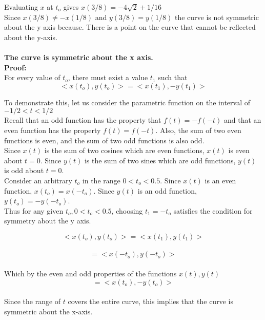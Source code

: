 \documentclass[a4paper,10pt]{scrartcl}
\begin{document}
Evaluating $x$ at $t_o$ gives $x(3/8) = -4\sqrt{2} + 1/16$ \\

Since $x(3/8) \neq -x(1/8)$ and $y(3/8) = y(1/8)$ the curve is not symmetric about the y axis because. There is a point on the curve that
cannot be reflected about the y-axis.\\\\


{\bfseries The curve is symmetric about the x axis.}\\

{\bfseries Proof:}\\

For every value of $t_o$, there must exist a value $t_1$ such that  
\[ <x(t_o), y(t_o)> = <x(t_1), -y(t_1)>\]

To demonstrate this, let us consider the parametric function on the interval of \\$-1/2 < t < 1/2$\\

Recall that an odd function has the property that $f(t) = -f(-t)$ and that an even
function has the property $f(t) = f(-t)$. Also, the sum of two even functions is even, and the sum of
two odd functions is also odd.\\

Since $x(t)$ is the sum of two cosines which are even functions, $x(t)$ is even about $t = 0$.
Since $y(t)$ is the sum of two sines which are odd functions, $y(t)$ is odd about $t = 0$.\\

Consider an arbitrary $t_o$ in the range $0 < t_o < 0.5$. Since $x(t)$ is an even function, $x(t_o) = x(-t_o)$.
Since $y(t)$ is an odd function, $y(t_o) = -y(-t_o)$. \\

Thus for any given $t_o, 0 < t_o < 0.5$, choosing $t_1 = -t_o$ satisfies the condition for symmetry about the y axis.

\[ <x(t_o), y(t_o)> = <x(t_1), y(t_1)>\]\\
\[ = <x(-t_o), y(-t_o)>\]\\
Which by the even and odd properties of the functions $x(t), y(t)$ \\ 
\[ = <x(t_o), -y(t_o)>\]\\

Since the range of $t$ covers the entire curve, this implies that the curve is symmetric about the x-axis.
\subsection{}
\end{document}
